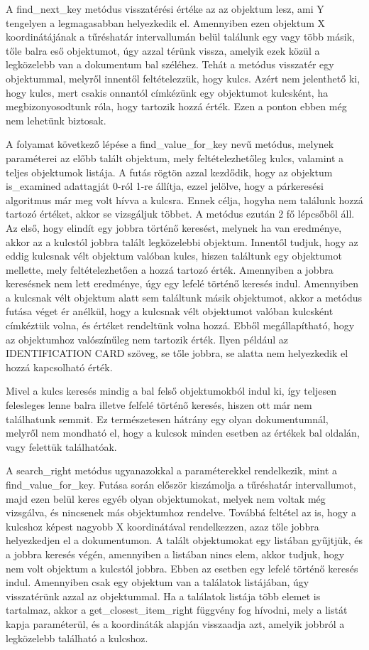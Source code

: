 \documentclass[12pt]{report}
\begin{document}
A find\_next\_key metódus visszatérési értéke az az objektum lesz, ami Y tengelyen a legmagasabban helyezkedik el. Amennyiben ezen objektum X koordinátájának a tűréshatár intervallumán belül találunk egy vagy több másik, tőle  balra eső objektumot, úgy azzal térünk vissza, amelyik ezek közül a legközelebb van a dokumentum bal széléhez. Tehát a metódus visszatér egy objektummal, melyről innentől feltételezzük, hogy kulcs. 
Azért nem jelenthető ki, hogy kulcs, mert csakis onnantól címkézünk egy objektumot kulcsként, ha megbizonyosodtunk róla, hogy tartozik hozzá érték. Ezen a ponton ebben még nem lehetünk biztosak.

A folyamat következő lépése a find\_value\_for\_key nevű metódus, melynek paraméterei az előbb talált objektum, mely feltételezhetőleg kulcs, valamint a teljes objektumok listája. A futás rögtön azzal kezdődik, hogy az objektum is\_examined adattagját 0-ról 1-re állítja, ezzel jelölve, hogy a párkeresési algoritmus már meg volt hívva a kulcsra. Ennek célja, hogyha nem találunk hozzá tartozó értéket, akkor se vizsgáljuk többet. A metódus ezután 2 fő lépcsőből áll. Az első, hogy elindít egy jobbra történő keresést, melynek ha van eredménye, akkor az a kulcstól jobbra talált legközelebbi objektum.
Innentől tudjuk, hogy az eddig kulcsnak vélt objektum valóban kulcs, hiszen találtunk egy objektumot mellette, mely feltételezhetően a hozzá tartozó érték. Amennyiben a jobbra keresésnek nem lett eredménye, úgy egy lefelé történő keresés indul. Amennyiben a kulcsnak vélt objektum alatt sem találtunk másik objektumot, akkor a metódus futása véget ér anélkül, hogy a kulcsnak vélt objektumot valóban kulcsként címkéztük volna, és értéket rendeltünk volna hozzá. Ebből megállapítható, hogy az objektumhoz valószínűleg nem tartozik érték.
Ilyen például az IDENTIFICATION CARD szöveg, se tőle jobbra, se alatta nem helyezkedik el hozzá kapcsolható érték.

Mivel a kulcs keresés mindig a bal felső objektumokból indul ki, így teljesen felesleges lenne balra illetve felfelé történő keresés, hiszen ott már nem találhatunk semmit. Ez természetesen hátrány egy olyan dokumentumnál, melyről nem mondható el, hogy a kulcsok minden esetben az értékek bal oldalán, vagy felettük találhatóak.

A search\_right metódus ugyanazokkal a paraméterekkel rendelkezik, mint a \break find\_value\_for\_key. Futása során először kiszámolja a tűréshatár intervallumot, majd ezen belül keres egyéb olyan objektumokat, melyek nem voltak még vizsgálva, és nincsenek más objektumhoz rendelve. Továbbá feltétel az is, hogy a kulcshoz képest nagyobb X koordinátával rendelkezzen, azaz tőle jobbra helyezkedjen el a dokumentumon.
A talált objektumokat egy listában gyűjtjük, és a jobbra keresés végén, amennyiben a listában nincs elem, akkor tudjuk, hogy nem volt objektum a kulcstól jobbra. Ebben az esetben egy lefelé történő keresés indul. Amennyiben csak egy objektum van a találatok listájában, úgy visszatérünk azzal az objektummal. Ha a találatok listája több elemet is tartalmaz, akkor a get\_closest\_item\_right függvény fog hívodni, mely a listát kapja paraméterül, és a koordináták alapján visszaadja azt, amelyik jobbról a legközelebb található a kulcshoz.
\end{document}
